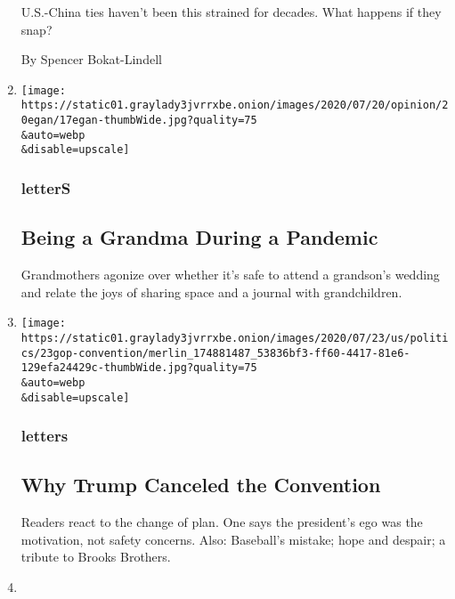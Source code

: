 \begin{enumerate}
  U.S.-China ties haven't been this strained for decades. What happens
  if they snap?

  By Spencer Bokat-Lindell
\item
  \href{/2020/07/28/opinion/letters/pandemic-families.html}{}

  \texttt{[image: https://static01.graylady3jvrrxbe.onion/images/2020/07/20/opinion/20egan/17egan-thumbWide.jpg?quality=75\\\&auto=webp\\\&disable=upscale]}

  \hypertarget{letters}{%
  \subsubsection{letterS}\label{letters}}

  \hypertarget{being-a-grandma-during-a-pandemic}{%
  \subsection{Being a Grandma During a
  Pandemic}\label{being-a-grandma-during-a-pandemic}}

  Grandmothers agonize over whether it's safe to attend a grandson's
  wedding and relate the joys of sharing space and a journal with
  grandchildren.
\item
  \href{/2020/07/28/opinion/letters/trump-convention.html}{}

  \texttt{[image: https://static01.graylady3jvrrxbe.onion/images/2020/07/23/us/politics/23gop-convention/merlin\_174881487\_53836bf3-ff60-4417-81e6-129efa24429c-thumbWide.jpg?quality=75\\\&auto=webp\\\&disable=upscale]}

  \hypertarget{letters-1}{%
  \subsubsection{letters}\label{letters-1}}

  \hypertarget{why-trump-canceled-the-convention}{%
  \subsection{Why Trump Canceled the
  Convention}\label{why-trump-canceled-the-convention}}

  Readers react to the change of plan. One says the president's ego was
  the motivation, not safety concerns. Also: Baseball's mistake; hope
  and despair; a tribute to Brooks Brothers.
\item
  \href{/2020/07/28/opinion/tears-teacher-crying-japan.html}{}


\end{enumerate}
